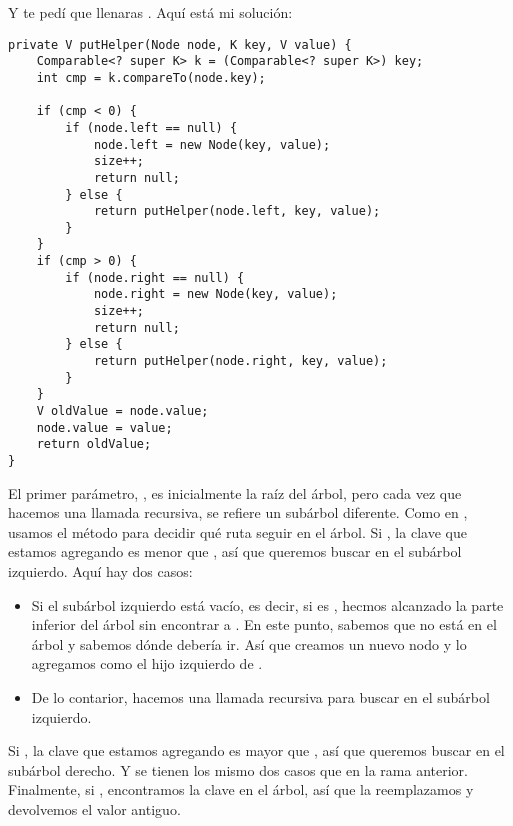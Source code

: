 \documentclass[12pt]{book}
\theoremstyle{exercise}
\begin{document}
Y te pedí que llenaras . Aquí está mi solución:

\begin{verbatim}
private V putHelper(Node node, K key, V value) {
    Comparable<? super K> k = (Comparable<? super K>) key;
    int cmp = k.compareTo(node.key);

    if (cmp < 0) {
        if (node.left == null) {
            node.left = new Node(key, value);
            size++;
            return null;
        } else {
            return putHelper(node.left, key, value);
        }
    }
    if (cmp > 0) {
        if (node.right == null) {
            node.right = new Node(key, value);
            size++;
            return null;
        } else {
            return putHelper(node.right, key, value);
        }
    }
    V oldValue = node.value;
    node.value = value;
    return oldValue;
}
\end{verbatim}


El primer parámetro, , es inicialmente la raíz del árbol,
pero cada vez que hacemos una llamada recursiva, se refiere un subárbol
diferente. Como en , usamos el método  para
decidir qué ruta seguir en el árbol. Si , la clave que
estamos agregando es menor que , así que queremos buscar
en el subárbol izquierdo. Aquí hay dos casos:

\begin{itemize}

\item
  Si el subárbol izquierdo está vacío, es decir, si  es
  , hecmos alcanzado la parte inferior del árbol sin encontrar a
  . En este punto, sabemos que  no está en el árbol
  y sabemos dónde debería ir. Así que creamos un nuevo nodo y lo agregamos
  como el hijo izquierdo de .

\item
  De lo contarior, hacemos una llamada recursiva para buscar en el subárbol izquierdo.

\end{itemize}

Si , la clave que estamos agregando es mayor que
, así que queremos buscar en el subárbol derecho. Y se
tienen los mismo dos casos que en la rama anterior.
Finalmente, si , encontramos la clave en el árbol, así que
la reemplazamos y devolvemos el valor antiguo.
\end{document}
